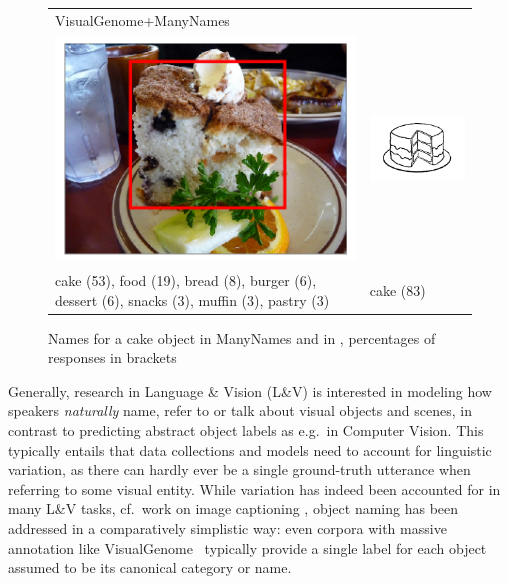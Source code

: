 \begin{figure}[tbp]
\scriptsize
\begin{tabular}{p{4.5cm}p{2cm}}
VisualGenome+ManyNames & \cite{snodgrass}\\
\includegraphics[scale=0.15]{figures/2390077_1254219_supercat_unique.png} &
\includegraphics[scale=0.4]{figures/snodgrass_vanderwart_cake_042.png}\\
 cake (53),  food (19), bread (8), burger (6), dessert (6), snacks (3), muffin (3),  pastry (3) & \hspace{0.5cm} cake (83)
\end{tabular}
\caption{Names for a cake object in ManyNames and in \cite{snodgrass}, percentages of responses in brackets}
\label{fig:cake}
\vspace{-0.5cm}
\end{figure}

Generally, research in Language \& Vision (L\&V) is interested in modeling how speakers \textit{naturally} name, refer to or talk about visual objects and scenes, in contrast to predicting abstract object labels as e.g.\ in Computer Vision.
This typically entails that data collections and models need to account for linguistic variation, as there can hardly ever be a single ground-truth utterance when referring to some visual entity. 
While variation has indeed been accounted for in many L\&V tasks, cf.\ work on image captioning \cite{Bernardietal:automatic}, object naming has been addressed in a comparatively simplistic way: 
even corpora with massive annotation like VisualGenome~\cite[\vg henceforth]{krishna2016visualgenome} typically provide a single label for each object assumed to be its canonical category or name.

